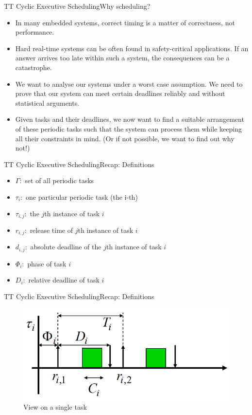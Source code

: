 \begin{frame}{TT Cyclic Executive Scheduling}{Why scheduling?}
    \begin{itemize}
        \item In many embedded systems, correct timing is a matter of \alert{correctness}, not performance.
        \item Hard real-time systems can be often found in safety-critical applications. If an answer arrives too late within such a system, the consequences can be a \alert{catastrophe}.
        \item We want to analyse our systems under a worst case assumption. We need to prove that our system can meet certain deadlines \alert{reliably} and \alert{without} statistical arguments.
        \item Given tasks and their deadlines, we now want to find a suitable arrangement of these periodic tasks such that the system can process them while keeping all their constraints in mind. (Or if not possible, we want to find out why not!)
    \end{itemize}
\end{frame}

\begin{frame}{TT Cyclic Executive Scheduling}{Recap: Definitions}
    \begin{itemize}
        \item $\Gamma:$ set of all periodic tasks
        \item $\tau_i:$ one particular periodic task (the i-th)
        \item $\tau_{i,j}:$ the $j$th instance of task $i$
        \item $r_{i,j}:$ release time of $j$th instance of task $i$
        \item $d_{i,j}:$ absolute deadline of the $j$th instance of task $i$
        \item $\Phi_i:$ phase of task $i$
        \item $D_i:$ relative deadline of task $i$
    \end{itemize}
\end{frame}

\begin{frame}{TT Cyclic Executive Scheduling}{Recap: Definitions}
\begin{figure}
    \centering
    \includegraphics[scale=0.5]{figures/task_instance.png}
    \caption{View on a single task}
    \label{instanceView}
\end{figure}
\end{frame}

